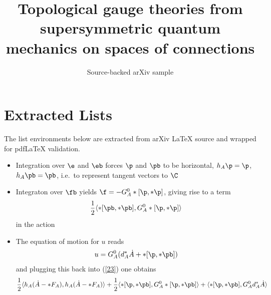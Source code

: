 \documentclass[11pt]{article}
\title{Topological gauge theories from supersymmetric quantum mechanics on
  spaces of connections}
\author{Source-backed arXiv sample}
\date{}
\begin{document}
\maketitle
\section{Extracted Lists}

The list environments below are extracted from arXiv LaTeX source and wrapped for pdfLaTeX validation.

\begin{itemize}
\item Integration over $\e$ and $\eb$ forces $\p$ and $\pb$ to be horizontal,
      $h_{A}\p=\p$, $h_{A}\pb=\pb$, i.e.~to represent tangent vectors to $\C$
\item Integraton over $\fb$ yields $\f=-G_{A}^{0}*[\p,*\p]$, giving rise to
      a term
      \[\frac{1}{2}\langle *[\pb,*\pb],G_{A}^{0}*[\p,*\p]\rangle\]
      in the action
\item The equation of motion for $u$ reads
      \[u=G_{A}^{0}(d_{A}^{*}\dot{A}+*[\p,*\pb])\]
      and plugging this back into (\ref{23}) one obtains
\[\frac{1}{2}\langle h_{A}(\dot{A}-*F_{A}),h_{A}(\dot{A}-*F_{A})\rangle
 +\frac{1}{2}\langle *[\p,*\pb],G_{A}^{0}*[\p,*\pb]\rangle +
  \langle *[\p,*\pb],G_{A}^{0}d_{A}^{*}\dot{A}\rangle\]
\end{itemize}
\end{document}
